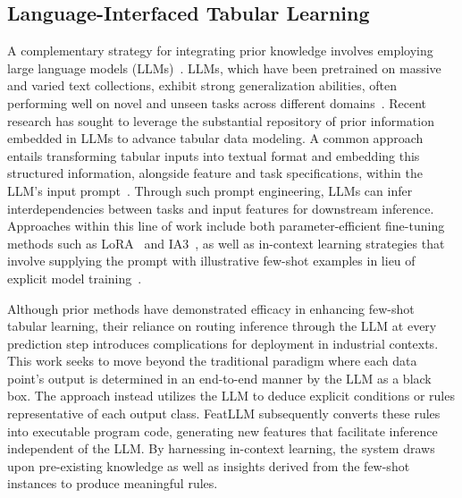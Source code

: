 \subsection{Language-Interfaced Tabular Learning} A complementary strategy for integrating prior knowledge involves employing large language models (LLMs)~\cite{anil2023palm,openai2023gpt4}. LLMs, which have been pretrained on massive and varied text collections, exhibit strong generalization abilities, often performing well on novel and unseen tasks across different domains~\cite{brown2020language}. Recent research has sought to leverage the substantial repository of prior information embedded in LLMs to advance tabular data modeling. A common approach entails transforming tabular inputs into textual format and embedding this structured information, alongside feature and task specifications, within the LLM's input prompt~\cite{dinh2022lift,hegselmann2023tabllm,wang2023anypredict}. Through such prompt engineering, LLMs can infer interdependencies between tasks and input features for downstream inference. Approaches within this line of work include both parameter-efficient fine-tuning methods such as LoRA~\cite{hu2021lora} and IA3~\cite{liu2022few}, as well as in-context learning strategies that involve supplying the prompt with illustrative few-shot examples in lieu of explicit model training~\cite{dinh2022lift,hegselmann2023tabllm,nam2023semi,slack2023tablet}.

Although prior methods have demonstrated efficacy in enhancing few-shot tabular learning, their reliance on routing inference through the LLM at every prediction step introduces complications for deployment in industrial contexts. This work seeks to move beyond the traditional paradigm where each data point’s output is determined in an end-to-end manner by the LLM as a black box. The approach instead utilizes the LLM to deduce explicit conditions or rules representative of each output class. \textsf{FeatLLM} subsequently converts these rules into executable program code, generating new features that facilitate inference independent of the LLM. By harnessing in-context learning, the system draws upon pre-existing knowledge as well as insights derived from the few-shot instances to produce meaningful rules.

